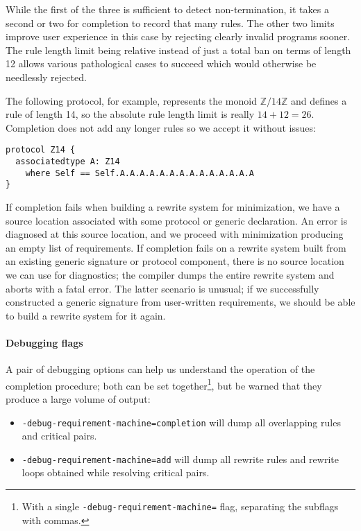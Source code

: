 \documentclass[../generics]{subfiles}
\begin{document}
While the first of the three is sufficient to detect non-termination, it takes a second or two for completion to record that many rules. The other two limits improve user experience in this case by rejecting clearly invalid programs sooner. The rule length limit being relative instead of just a total ban on terms of length 12 allows various pathological cases to succeed which would otherwise be needlessly rejected.

The following protocol, for example, represents the monoid $\mathbb{Z}/14\mathbb{Z}$ and defines a rule of length 14, so the absolute rule length limit is really $14+12=26$. Completion does not add any longer rules so we accept it without issues:
\begin{Verbatim}
protocol Z14 {
  associatedtype A: Z14
    where Self == Self.A.A.A.A.A.A.A.A.A.A.A.A.A.A
}
\end{Verbatim}

If completion fails when building a rewrite system for minimization, we have a source location associated with some protocol or generic declaration. An error is diagnosed at this source location, and we proceed with minimization producing an empty list of requirements. If completion fails on a rewrite system built from an existing generic signature or protocol component, there is no source location we can use for diagnostics; the compiler dumps the entire rewrite system and aborts with a fatal error. The latter scenario is unusual; if we successfully constructed a generic signature from user-written requirements, we should be able to build a rewrite system for it again.

\paragraph{Debugging flags}
A pair of debugging options can help us understand the operation of the completion procedure; both can be set together\footnote{With a single \texttt{-debug-requirement-machine=} flag, separating the subflags with commas.}, but be warned that they produce a large volume of output:
\begin{itemize}
\item {} \texttt{-debug-requirement-machine=completion} will dump all overlapping rules and critical pairs.
\item {} \texttt{-debug-requirement-machine=add} will dump all rewrite rules and rewrite loops obtained while resolving critical pairs.
\end{itemize}
\end{document}

